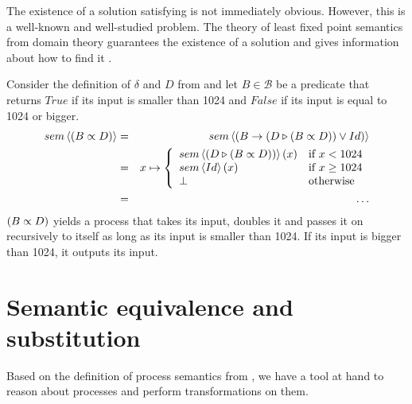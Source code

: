 The existence of a solution satisfying  is not immediately obvious. However, this is a well-known and well-studied problem. The theory of least fixed point semantics from domain theory guarantees the existence of a solution and gives information about how to find it \cite{DenSem}.

\begin{example}
\label{exp:sem_repetition}
Consider the definition of $\delta$ and $D$ from  and let $B \in \mathcal{B}$ be a predicate that returns $True$ if its input is smaller than 1024 and $False$ if its input is equal to 1024 or bigger.
  \begin{eqnarray*}
    sem \left\langle \left( B \propto D \right) \right\rangle & = & sem \left\langle \left( B \to \left( D \triangleright \left( B \propto D \right) \right) \vee Id \right) \right\rangle \\
                            & = & x \mapsto \left\{ \begin{array}{ll} 
                                                      sem \left\langle \left( D \triangleright \left( B \propto D \right) \right) \right\rangle \left( x \right) & \text{if } x < 1024 \\
                                                      sem \left\langle Id \right\rangle \left( x \right)                              & \text{if } x \geq 1024 \\
                                                      \bot                                                   & \text{otherwise}
                                                    \end{array}
                                            \right. \\
                            & = & \ldots
  \end{eqnarray*}
$\left( B \propto D \right)$ yields a process that takes its input, doubles it and passes it on recursively to itself as long as its input is smaller than 1024. If its input is bigger than 1024, it outputs its input.
\end{example}


\clearpage
\section{Semantic equivalence and substitution}
\label{chp:semantic_equivalence}
Based on the definition of process semantics from , we have a tool at hand to reason about processes and perform transformations on them.

